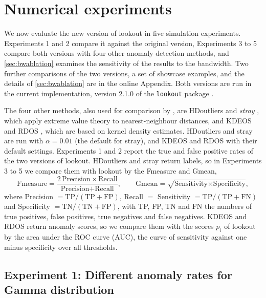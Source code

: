 \section{Numerical experiments}\label{sec:experiments}

We now evaluate the new version of lookout in five simulation experiments. Experiments 1 and 2 compare it against the original version, Experiments 3 to 5 compare both versions with four other anomaly detection methods, and \cref{sec:bwablation} examines the sensitivity of the results to the bandwidth. Two further comparisons of the two versions, a set of showcase examples, and the details of \cref{sec:bwablation} are in the online Appendix. Both versions are run in the current implementation, version 2.1.0 of the \texttt{lookout} package \citep{Rlookout}. 

The four other methods, also used for comparison by \citet{lookout}, are HDoutliers \citep{wilkinson2017visualizing} and \textit{stray} \citep{stray}, which apply extreme value theory to nearest-neighbour distances, and KDEOS \citep{Schubert2014} and RDOS \citep{Tang2017}, which are based on kernel density estimates. HDoutliers and stray are run with $\alpha=0.01$ (the default for stray), and KDEOS and RDOS with their default settings. Experiments 1 and 2 report the true and false positive rates of the two versions of lookout. HDoutliers and stray return labels, so in Experiments 3 to 5 we compare them with lookout by the Fmeasure and Gmean,
$$
  \text{Fmeasure} = \frac{2\,\text{Precision}\times\text{Recall}}{\text{Precision} + \text{Recall}},
  \qquad
  \text{Gmean} = \sqrt{\text{Sensitivity} \times \text{Specificity}},
$$
where Precision $= \text{TP}/(\text{TP} + \text{FP})$, Recall $=$ Sensitivity $= \text{TP}/(\text{TP} + \text{FN})$ and Specificity $= \text{TN}/(\text{TN} + \text{FP})$, with TP, FP, TN and FN the numbers of true positives, false positives, true negatives and false negatives. KDEOS and RDOS return anomaly scores, so we compare them with the scores $p_i$ of lookout by the area under the ROC curve (AUC), the curve of sensitivity against one minus specificity over all thresholds.

\subsection{Experiment 1: Different anomaly rates for Gamma distribution}

